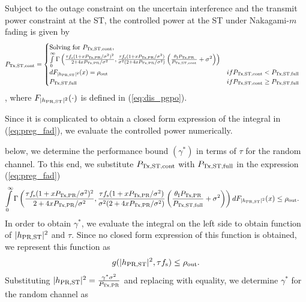 \begin{lemma} \label{lm:lm6}
\normalfont
Subject to the outage constraint on the uncertain interference and the transmit power constraint at the ST, the controlled power at the ST under Nakagami-$m$ fading is given by
\begin{align}
\preg &=  
\begin{cases} 
\text{Solving for $\preg$, } \\ \int\limits_{0}^{\infty} \Gamma\left(\frac{\tau \fsam (1 + x \ptran/\nps)^2}{2 + 4 x \ptran/\nps}, \frac{\tau \fsam (1 + x \ptran/\nps)}{\nps (2 + 4 x \ptran/\nps)} \left(\frac{\ite\ptran}{\preg} + \nps \right)\right) \\d \fpgpo(x) = \opc & \mbox{if } \preg < \pc \\
\pc & \mbox{if } \preg \ge \pc
\end{cases}
\label{eq:preg_fad} 
\end{align}
, where %
$F_{|h_{\text{PR,ST}}|^2}(\cdot)$ is defined in (\ref{eq:dis_pgpo}). 
\end{lemma} 
\begin{IEEEproof}
Since it is complicated to obtain a closed form expression of the integral in (\ref{eq:preg_fad}), we evaluate the controlled power numerically.  
\end{IEEEproof}
 below, we determine the performance bound $(\gamma^*)$ in terms of $\tau$ for the random channel.
To this end, we substitute $P_{\text{Tx,ST,cont}}$ with $P_{\text{Tx,ST,full}}$ in the expression (\ref{eq:preg_fad}) 
\begin{align}
\int\limits_{0}^{\infty} \Gamma\left( \frac{\tau \fsam (1 + x \ptran/\nps)^2}{2 + 4 x \ptran/\nps}, \frac{\tau \fsam (1 + x \ptran/\nps)}{\nps (2 + 4 x \ptran/\nps)}  \left(\frac{\ite\ptran}{\pc} + \nps \right)\right) d \fpgpo(x) &\le \opc. \label{eq:or_fad}
\end{align}
{In order to obtain $\gamma^*$, we evaluate the integral on the left side to obtain function of $|h_{\text{PR,ST}}|^2$ and $\tau$. Since no closed form expression of this function is obtained, we represent this function as}
\begin{align*}
g(|h_{\text{PR,ST}}|^2, \tau f_{\text{s}}) \le \rho_{\text{out}}. \nonumber   
\end{align*}
{Substituting $|h_{\text{PR,ST}}|^2 = \frac{\gamma^* \sigma^2}{P_{\text{Tx,PR}}}$ and replacing with equality, we determine $\gamma^*$ for the random channel as} 
